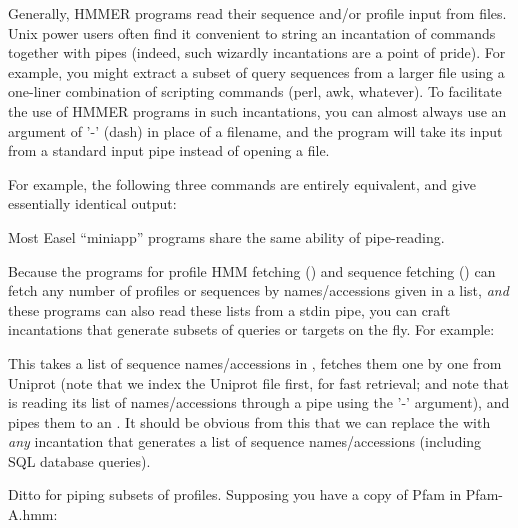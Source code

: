 Generally, HMMER programs read their sequence and/or profile input
from files. Unix power users often find it convenient to string an
incantation of commands together with pipes (indeed, such wizardly
incantations are a point of pride). For example, you might extract a
subset of query sequences from a larger file using a one-liner
combination of scripting commands (perl, awk, whatever). To facilitate
the use of HMMER programs in such incantations, you can almost always
use an argument of '-' (dash) in place of a filename, and the program
will take its input from a standard input pipe instead of opening a
file.

For example, the following three commands are entirely equivalent, and
give essentially identical output:




Most Easel ``miniapp'' programs share the same ability of pipe-reading.

Because the programs for profile HMM fetching () and
sequence fetching () can fetch any number of profiles
or sequences by names/accessions given in a list, \emph{and} these
programs can also read these lists from a stdin pipe, you can craft
incantations that generate subsets of queries or targets on the
fly. For example:


This takes a list of sequence names/accessions in
, fetches them one by one from Uniprot (note that
we index the Uniprot file first, for fast retrieval; and note that
 is reading its  list of
names/accessions through a pipe using the '-' argument), and pipes
them to an . It should be obvious from this that we
can replace the  with \emph{any} incantation
that generates a list of sequence names/accessions (including SQL
database queries).

Ditto for piping subsets of profiles. Supposing you have a copy of Pfam in Pfam-A.hmm:



